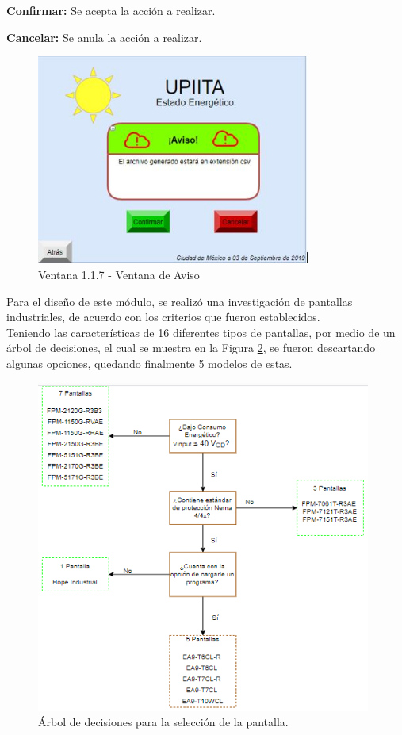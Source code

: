\textbf{Confirmar:} Se acepta la acción a realizar.

\textbf{Cancelar:} Se anula la acción a realizar.

\begin{figure}[H]
	\centering
	\includegraphics[width=9cm]{imagenes/v117}
	\caption{Ventana 1.1.7 - Ventana de Aviso}
	\label{fig:v117}
\end{figure}

\newpage
Para el diseño de este módulo, se realizó una investigación de pantallas industriales, de acuerdo con los criterios que fueron establecidos. \\

Teniendo las características de 16 diferentes tipos de pantallas, por medio de un árbol de decisiones, el cual se muestra en la Figura \ref{fig:ArbolD}, se fueron descartando algunas opciones, quedando finalmente 5 modelos de estas. 

\begin{figure}[H]
	\centering
	\includegraphics[width=11cm]{imagenes/ArbolDesiciones}
	\caption{Árbol de decisiones para la selección de la pantalla.}
	\label{fig:ArbolD}
\end{figure}

